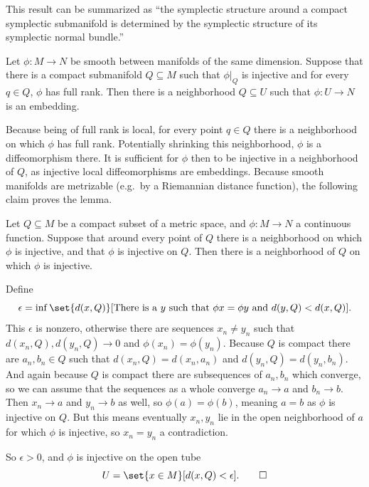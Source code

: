 \eproof

\bnote

    This result can be summarized as ``the symplectic structure around a compact symplectic submanifold is determined by the symplectic structure of its
    symplectic normal bundle.''

\enote

\blemm

    Let $\phi\colon M\to N$ be smooth between manifolds of the same dimension.
    Suppose that there is a compact submanifold $Q\subseteq M$ such that $\phi|_Q$ is injective and for every $q\in Q$, $\phi$ has full rank.
    Then there is a neighborhood $Q\subseteq U$ such that $\phi\colon U\to N$ is an embedding.

\elemm

\bproof

    Because being of full rank is local, for every point $q\in Q$ there is a neighborhood on which $\phi$ has full rank.
    Potentially shrinking this neighborhood, $\phi$ is a diffeomorphism there.
    It is sufficient for $\phi$ then to be injective in a neighborhood of $Q$, as injective local diffeomorphisms are embeddings.
    Because smooth manifolds are metrizable (e.g.\ by a Riemannian distance function), the following claim proves the lemma.

    Let $Q\subseteq M$ be a compact subset of a metric space, and $\phi\colon M\to N$ a continuous function.
    Suppose that around every point of $Q$ there is a neighborhood on which $\phi$ is injective, and that $\phi$ is injective on $Q$.
    Then there is a neighborhood of $Q$ on which $\phi$ is injective.

    Define
    $$ \epsilon = \inf\set{d(x,Q)}[\hbox{There is a $y$ such that $\phi x=\phi y$ and $d(y,Q)<d(x,Q)$}] . $$
    This $\epsilon$ is nonzero, otherwise there are sequences $x_n\neq y_n$ such that $d(x_n,Q),d(y_n,Q)\to0$ and $\phi(x_n)=\phi(y_n)$.
    Because $Q$ is compact there are $a_n,b_n\in Q$ such that $d(x_n,Q)=d(x_n,a_n)$ and $d(y_n,Q)=d(y_n,b_n)$.
    And again because $Q$ is compact there are subsequences of $a_n,b_n$ which converge, so we can assume that the sequences as a whole converge
    $a_n\to a$ and $b_n\to b$.
    Then $x_n\to a$ and $y_n\to b$ as well, so $\phi(a)=\phi(b)$, meaning $a=b$ as $\phi$ is injective on $Q$.
    But this means eventually $x_n,y_n$ lie in the open neighborhood of $a$ for which $\phi$ is injective, so $x_n=y_n$ a contradiction.

    So $\epsilon>0$, and $\phi$ is injective on the open tube
    $$ U = \set{x\in M}[d(x,Q)<\epsilon] . \qed $$

